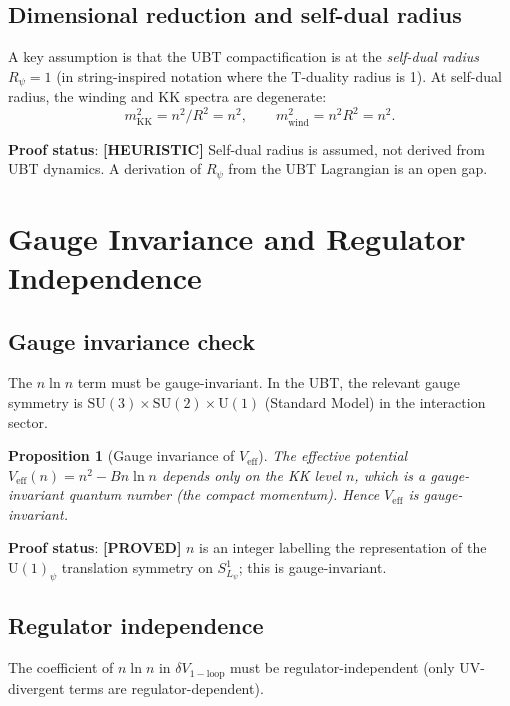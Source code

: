 \documentclass[11pt,a4paper]{article}
\newtheorem{proposition}{Proposition}
\newcommand{\proved}[1]{\textbf{[PROVED]} #1}
\newcommand{\heuristic}[1]{\textbf{[HEURISTIC]} #1}
\begin{document}
\subsection{Dimensional reduction and self-dual radius}

A key assumption is that the UBT compactification is at the \emph{self-dual radius}
$R_\psi = 1$ (in string-inspired notation where the T-duality radius is 1).
At self-dual radius, the winding and KK spectra are degenerate:
\[
  m_\mathrm{KK}^2 = n^2/R^2 = n^2, \qquad
  m_\mathrm{wind}^2 = n^2 R^2 = n^2.
\]

\textbf{Proof status}: \heuristic{Self-dual radius is assumed, not derived
from UBT dynamics.  A derivation of $R_\psi$ from the UBT Lagrangian is
an open gap.}

\section{Gauge Invariance and Regulator Independence}

\subsection{Gauge invariance check}

The $n\ln n$ term must be gauge-invariant.  In the UBT, the relevant gauge
symmetry is $\mathrm{SU}(3)\times\mathrm{SU}(2)\times\mathrm{U}(1)$ (Standard Model)
in the interaction sector.

\begin{proposition}[Gauge invariance of $V_\mathrm{eff}$]
  The effective potential $V_\mathrm{eff}(n) = n^2 - Bn\ln n$ depends only on
  the KK level $n$, which is a gauge-invariant quantum number (the compact
  momentum).  Hence $V_\mathrm{eff}$ is gauge-invariant.
\end{proposition}

\textbf{Proof status}: \proved{$n$ is an integer labelling the representation
of the $\mathrm{U}(1)_\psi$ translation symmetry on $S^1_{L_\psi}$; this is
gauge-invariant.}

\subsection{Regulator independence}

The coefficient of $n\ln n$ in $\delta V_\mathrm{1-loop}$ must be
regulator-independent (only UV-divergent terms are regulator-dependent).
\end{document}

